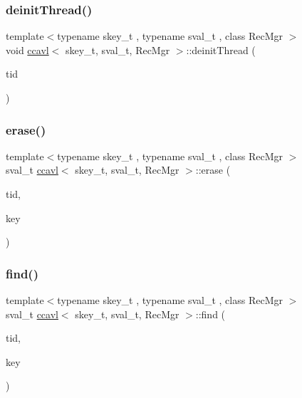 \subsubsection{\texorpdfstring{deinit\+Thread()}{deinitThread()}}
{\footnotesize\ttfamily template$<$typename skey\+\_\+t , typename sval\+\_\+t , class Rec\+Mgr $>$ \\
void \hyperlink{classccavl}{ccavl}$<$ skey\+\_\+t, sval\+\_\+t, Rec\+Mgr $>$\+::deinit\+Thread (\begin{DoxyParamCaption}\item[{const int}]{tid }\end{DoxyParamCaption})\hspace{0.3cm}{\ttfamily [inline]}}

\mbox{\label{classccavl_ad574827b3181dfcc2758d33a920ef888}} 
\subsubsection{\texorpdfstring{erase()}{erase()}}
{\footnotesize\ttfamily template$<$typename skey\+\_\+t , typename sval\+\_\+t , class Rec\+Mgr $>$ \\
sval\+\_\+t \hyperlink{classccavl}{ccavl}$<$ skey\+\_\+t, sval\+\_\+t, Rec\+Mgr $>$\+::erase (\begin{DoxyParamCaption}\item[{const int}]{tid,  }\item[{skey\+\_\+t}]{key }\end{DoxyParamCaption})\hspace{0.3cm}{\ttfamily [inline]}}

\mbox{\label{classccavl_ad6102621e94aacf02a6ae441c6b2010a}} 
\subsubsection{\texorpdfstring{find()}{find()}}
{\footnotesize\ttfamily template$<$typename skey\+\_\+t , typename sval\+\_\+t , class Rec\+Mgr $>$ \\
sval\+\_\+t \hyperlink{classccavl}{ccavl}$<$ skey\+\_\+t, sval\+\_\+t, Rec\+Mgr $>$\+::find (\begin{DoxyParamCaption}\item[{const int}]{tid,  }\item[{skey\+\_\+t}]{key }\end{DoxyParamCaption})\hspace{0.3cm}{\ttfamily [inline]}}

